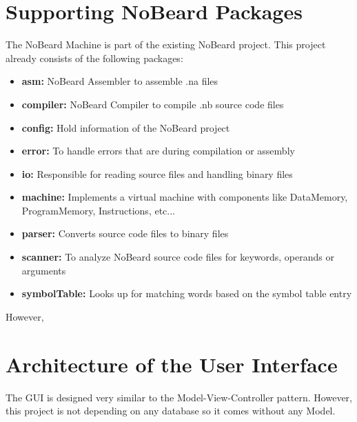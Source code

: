 \section{Supporting NoBeard Packages}
The NoBeard Machine is part of the existing NoBeard project. This project already consists of the following packages:
\begin{itemize}
\item \textbf{asm: }NoBeard Assembler to assemble .na files 
\item \textbf{compiler: }NoBeard Compiler to compile .nb source code files
\item \textbf{config: }Hold information of the NoBeard project
\item \textbf{error: }To handle errors that are  during compilation or assembly   
\item \textbf{io: }Responsible for reading source files and handling binary files 
\item \textbf{machine: }Implements a virtual machine with components like DataMemory, ProgramMemory, Instructions, etc...  
\item \textbf{parser: }Converts source code files to binary files 
\item \textbf{scanner: }To analyze NoBeard source code files for keywords, operands or arguments  
\item \textbf{symbolTable: }Looks up for matching words based on the symbol table entry  
\end{itemize}
However, 
\section{Architecture of the User Interface}
The GUI is designed very similar to the Model-View-Controller pattern. However, this project is not depending on any database so it comes without any Model.

